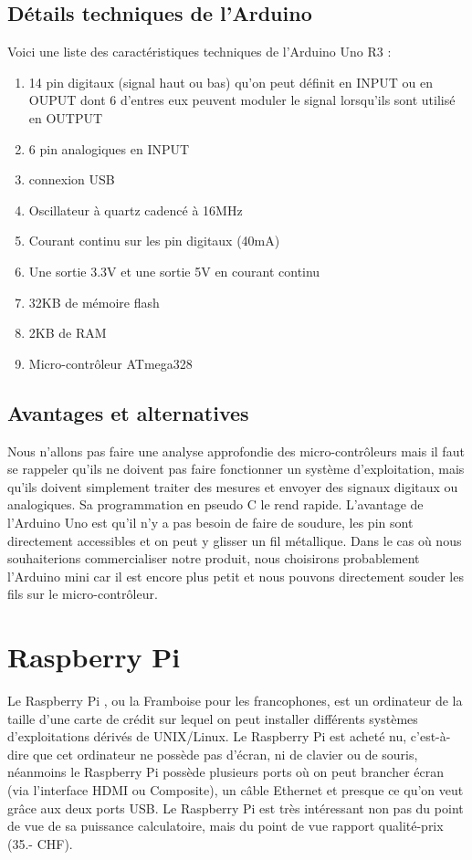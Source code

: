 \documentclass[a4paper,11pt]{report}
\begin{document}
{\subsection{Détails techniques de l'Arduino}

Voici une liste des caractéristiques techniques de l'Arduino Uno R3 \cite{Arduino}:
\begin{enumerate}
\item 14 pin digitaux (signal haut ou bas) qu'on peut définit en INPUT ou en OUPUT dont 6 d'entres eux peuvent moduler le signal lorsqu'ils sont utilisé en OUTPUT
\item  6 pin analogiques  en INPUT
\item connexion USB
\item Oscillateur à quartz cadencé à 16MHz
\item Courant continu sur les pin digitaux (40mA)
\item Une sortie 3.3V et une sortie 5V en courant continu
\item 32KB de mémoire flash
\item 2KB de RAM
\item Micro-contrôleur ATmega328
\end{enumerate}
\subsection{Avantages et alternatives}
Nous n'allons pas faire une analyse approfondie des micro-contrôleurs mais il faut se rappeler qu'ils ne doivent pas faire fonctionner un système d'exploitation, mais qu'ils doivent simplement traiter des mesures et envoyer des signaux digitaux ou analogiques. Sa programmation en pseudo C le rend rapide. L'avantage de l'Arduino Uno est qu'il n'y a pas besoin de faire de soudure, les pin sont directement accessibles et on peut y glisser un fil métallique. Dans le cas où nous souhaiterions commercialiser notre produit, nous choisirons probablement l'Arduino mini car il est encore plus petit et nous pouvons directement souder les fils sur le micro-contrôleur.

\section{Raspberry Pi}
Le Raspberry Pi \cite{RaspberryPiCaracteristiques}, ou la Framboise pour les francophones, est un ordinateur de la taille d'une carte de crédit sur lequel on peut installer différents systèmes d'exploitations dérivés de UNIX/Linux. Le Raspberry Pi est acheté nu, c'est-à-dire que cet ordinateur ne possède pas d'écran, ni de clavier ou de souris, néanmoins le Raspberry Pi possède plusieurs ports où on peut brancher écran (via l'interface HDMI ou Composite), un câble Ethernet et presque ce qu'on veut grâce aux deux ports USB. Le Raspberry Pi est très intéressant non pas du point de vue de sa puissance calculatoire, mais du point de vue rapport qualité-prix (35.- CHF).

}
\end{document}
